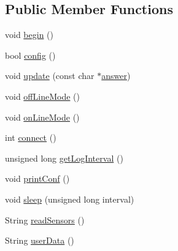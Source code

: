 \subsection*{Public Member Functions}
\begin{DoxyCompactItemize}
\item 
void \hyperlink{classCoolBoard_acba7c5aef7268b2c0044bdb54d3b9d76}{begin} ()
\item 
bool \hyperlink{classCoolBoard_a583a874c09c07e70a6eb9229fc4beddb}{config} ()
\item 
void \hyperlink{classCoolBoard_a8612756d3f73198cdde857a66f0fe690}{update} (const char $\ast$\hyperlink{classCoolBoard_a7b835fafd449e5282f7f91d787a2dc15}{answer})
\item 
void \hyperlink{classCoolBoard_ae6b5e1274d760462290192acea4adca8}{off\+Line\+Mode} ()
\item 
void \hyperlink{classCoolBoard_aa0bbc4bc605e35618d18e68795c61363}{on\+Line\+Mode} ()
\item 
int \hyperlink{classCoolBoard_a519de78b807f8ec6463ff484eb925918}{connect} ()
\item 
unsigned long \hyperlink{classCoolBoard_a7508e029f2ee17bb747ffab599285e0d}{get\+Log\+Interval} ()
\item 
void \hyperlink{classCoolBoard_a486507b8f0981d3cc671ed31c2145755}{print\+Conf} ()
\item 
void \hyperlink{classCoolBoard_a069952cdcb2e7f68518aa429eceadb6e}{sleep} (unsigned long interval)
\item 
String \hyperlink{classCoolBoard_ad03abdce2e65f520bbf2cff0f2d083cf}{read\+Sensors} ()
\item 
String \hyperlink{classCoolBoard_ae7358fb6e623cfc81b775f5f1734909b}{user\+Data} ()
\end{DoxyCompactItemize}
